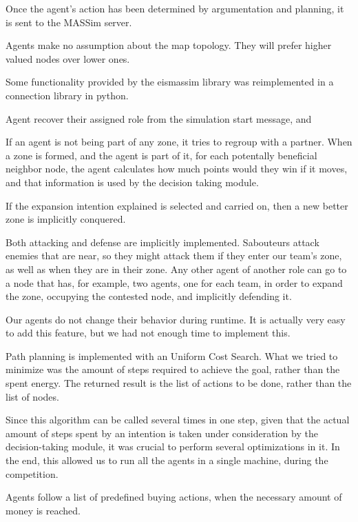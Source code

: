 \documentclass{llncs2e/llncs}
\begin{document}
    Once the agent's action has been determined by argumentation and planning, it 
    is sent to the MASSim server.

    Agents make no assumption about the map topology. They will prefer higher 
    valued nodes over lower ones.

    Some functionality provided by the eismassim library was reimplemented in a 
    connection library in python.

    Agent recover their assigned role from the simulation start message, and 

    If an agent is not being part of any zone, it tries to regroup with a partner. 
    When a zone is formed, and the agent is part of it, for each potentally 
    beneficial neighbor node, the agent calculates how much points would they win 
    if it moves, and that information is used by the decision taking module.

    If the expansion intention explained is selected and carried on, then a new 
    better zone is implicitly conquered.

    Both attacking and defense are implicitly implemented. Sabouteurs attack 
    enemies that are near, so they might attack them if they enter our team's 
    zone, as well as when they are in their zone. Any other agent of another role
    can go to a node that has, for example, two agents, one for each team, in order
    to expand the zone, occupying the contested node, and implicitly defending it.
    

    Our agents do not change their behavior during runtime. It is actually very 
    easy to add this feature, but we had not enough time to implement this.

    Path planning is implemented with an Uniform Cost Search. What we tried to 
    minimize was the amount of steps required to achieve the goal, rather than the 
    spent energy. The returned result is the list of actions to be done, rather 
    than the list of nodes.
    
    Since this algorithm can be called several times in one step, given that the 
    actual amount of steps spent by an intention is taken under consideration by 
    the decision-taking module, it was crucial to perform several optimizations in 
    it. In the end, this allowed us to run all the agents in a single machine, 
    during the competition.

    Agents follow a list of predefined buying actions, when the necessary amount 
    of money is reached.
    
\end{document}
